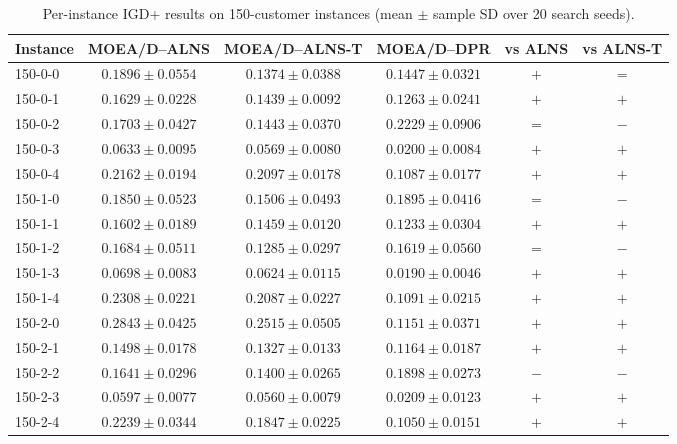 \begin{table}[t]
\centering
\caption{Per-instance IGD+ results on 150-customer instances (mean $\pm$ sample SD over 20 search seeds).}
\begin{tabular}{lccccc}
\toprule
Instance & MOEA/D--ALNS & MOEA/D--ALNS-T & MOEA/D--DPR & vs ALNS & vs ALNS-T \\
\midrule
150-0-0 & $0.1896 \pm 0.0554$ & $\mathbf{0.1374 \pm 0.0388}$ & $0.1447 \pm 0.0321$ & $+$ & $=$ \\
150-0-1 & $0.1629 \pm 0.0228$ & $0.1439 \pm 0.0092$ & $\mathbf{0.1263 \pm 0.0241}$ & $+$ & $+$ \\
150-0-2 & $0.1703 \pm 0.0427$ & $\mathbf{0.1443 \pm 0.0370}$ & $0.2229 \pm 0.0906$ & $=$ & $-$ \\
150-0-3 & $0.0633 \pm 0.0095$ & $0.0569 \pm 0.0080$ & $\mathbf{0.0200 \pm 0.0084}$ & $+$ & $+$ \\
150-0-4 & $0.2162 \pm 0.0194$ & $0.2097 \pm 0.0178$ & $\mathbf{0.1087 \pm 0.0177}$ & $+$ & $+$ \\
150-1-0 & $0.1850 \pm 0.0523$ & $\mathbf{0.1506 \pm 0.0493}$ & $0.1895 \pm 0.0416$ & $=$ & $-$ \\
150-1-1 & $0.1602 \pm 0.0189$ & $0.1459 \pm 0.0120$ & $\mathbf{0.1233 \pm 0.0304}$ & $+$ & $+$ \\
150-1-2 & $0.1684 \pm 0.0511$ & $\mathbf{0.1285 \pm 0.0297}$ & $0.1619 \pm 0.0560$ & $=$ & $-$ \\
150-1-3 & $0.0698 \pm 0.0083$ & $0.0624 \pm 0.0115$ & $\mathbf{0.0190 \pm 0.0046}$ & $+$ & $+$ \\
150-1-4 & $0.2308 \pm 0.0221$ & $0.2087 \pm 0.0227$ & $\mathbf{0.1091 \pm 0.0215}$ & $+$ & $+$ \\
150-2-0 & $0.2843 \pm 0.0425$ & $0.2515 \pm 0.0505$ & $\mathbf{0.1151 \pm 0.0371}$ & $+$ & $+$ \\
150-2-1 & $0.1498 \pm 0.0178$ & $0.1327 \pm 0.0133$ & $\mathbf{0.1164 \pm 0.0187}$ & $+$ & $+$ \\
150-2-2 & $0.1641 \pm 0.0296$ & $\mathbf{0.1400 \pm 0.0265}$ & $0.1898 \pm 0.0273$ & $-$ & $-$ \\
150-2-3 & $0.0597 \pm 0.0077$ & $0.0560 \pm 0.0079$ & $\mathbf{0.0209 \pm 0.0123}$ & $+$ & $+$ \\
150-2-4 & $0.2239 \pm 0.0344$ & $0.1847 \pm 0.0225$ & $\mathbf{0.1050 \pm 0.0151}$ & $+$ & $+$ \\
\bottomrule
\end{tabular}
\end{table}

